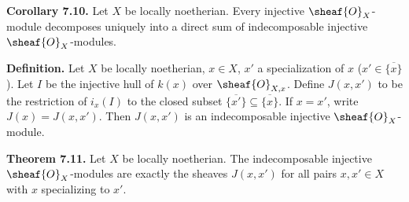 \textbf{Corollary 7.10.}
Let $X$ be locally noetherian. Every injective $\sheaf{O}_X$-module decomposes uniquely into a direct sum of indecomposable injective $\sheaf{O}_X$-modules.

\textbf{Definition.}
Let $X$ be locally noetherian, $x\in X$, $x'$ a specialization of $x$ ($x'\in\overline{\{x\}}$). Let $I$ be the injective hull of $k(x)$ over $\sheaf{O}_{X,x}$. Define $J(x,x')$ to be the restriction of $i_x(I)$ to the closed subset $\overline{\{x'\}}\subseteq\overline{\{x\}}$. If $x=x'$, write $J(x)=J(x,x')$. Then $J(x,x')$ is an indecomposable injective $\sheaf{O}_X$-module.

\textbf{Theorem 7.11.}
Let $X$ be locally noetherian. The indecomposable injective $\sheaf{O}_X$-modules are exactly the sheaves $J(x,x')$ for all pairs $x,x'\in X$ with $x$ specializing to $x'$.